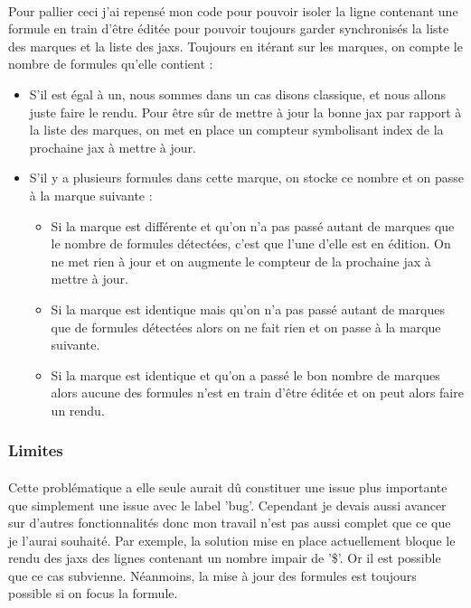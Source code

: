 \documentclass[12pt]{article}
\begin{document}
\paragraph{}
Pour pallier ceci j'ai repensé mon code pour pouvoir isoler la ligne contenant une formule en train d'être éditée pour pouvoir toujours garder synchronisés la liste des marques et la liste des jaxs. Toujours en itérant sur les marques, on compte le nombre de formules qu'elle contient :\\
\begin{itemize}
    \item S'il est égal à un, nous sommes dans un cas disons classique, et nous allons juste faire le rendu. Pour être sûr de mettre à jour la bonne jax par rapport à la liste des marques, on met en place un compteur symbolisant index de la prochaine jax à mettre à jour.
    \item S'il y a plusieurs formules dans cette marque, on stocke ce nombre et on passe à la marque suivante :\\
    \begin{itemize}
        \item Si la marque est différente et qu'on n'a pas passé autant de marques que le nombre de formules détectées, c'est que l'une d'elle est en édition. On ne met rien à jour et on augmente le compteur de la prochaine jax à mettre à jour.
        \item Si la marque est identique mais qu'on n'a pas passé autant de marques que de formules détectées alors on ne fait rien et on passe à la marque suivante.
        \item Si la marque est identique et qu'on a passé le bon nombre de marques alors aucune des formules n'est en train d'être éditée et on peut alors faire un rendu.
    \end{itemize}
\end{itemize}

\subsubsection{Limites}
\paragraph{}
Cette problématique a elle seule aurait dû constituer une issue plus importante que simplement une issue avec le label 'bug'. Cependant je devais aussi avancer sur d'autres fonctionnalités donc mon travail n'est pas aussi complet que ce que je l'aurai souhaité. Par exemple, la solution mise en place actuellement bloque le rendu des jaxs des lignes contenant un nombre impair de '\$'. Or il est possible que ce cas subvienne. Néanmoins, la mise à jour des formules est toujours possible si on focus la formule.
\end{document}
